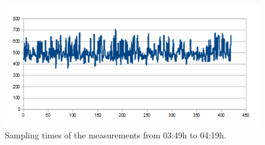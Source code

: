 \begin{figure}[tbp]
	\centering
	\includegraphics[scale=0.75]{content/images/Experiment/NightRounds}
 	\caption{Sampling times of the measurements from 03:49h to 04:19h.}
	\label{fig:nightR}
\end{figure}

